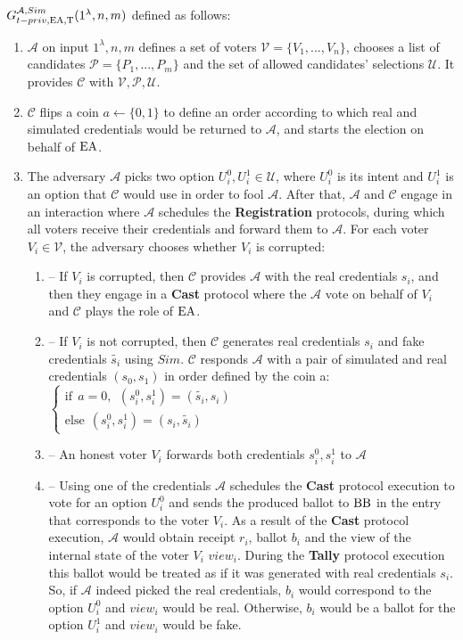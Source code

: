  $G_{t-priv,\operatorname{EA},\operatorname{T}}^{\mathcal{A}, Sim}(1^{\lambda},n,m)$ defined as follows:\\
\begin{enumerate}
\item $\mathcal{A}$ on input $1^{\lambda},n,m$ defines a set of voters  $\mathcal{V} = \{V_1,...,V_n\}$, chooses a list of candidates  $\mathcal{P} = \{P_1,...,P_m\}$ and the set of allowed candidates' selections $\mathcal{U}$.  It provides $\mathcal{C}$ with $\mathcal{V}, \mathcal{P}, \mathcal{U}$.
\item $\mathcal{C}$ flips a coin $a \leftarrow \{0,1\}$ to define an order according to which real and simulated credentials would be returned to $\mathcal{A}$, and starts the election on behalf of $\operatorname{EA}$. 
\item The adversary $\mathcal{A}$ picks two option $U^0_i,U^1_i \in \mathcal{U}$, where $U^0_i$ is its intent and $U^1_i$ is an option that $\mathcal{C}$ would use in order to fool $\mathcal{A}$.  After that, $\mathcal{A}$  and $\mathcal{C}$ engage in an interaction where $\mathcal{A}$ schedules the \textbf{Registration} protocols, during which all voters receive their credentials and forward them to  $\mathcal{A}$. For each voter $V_i \in \mathcal{V}$, the adversary chooses whether $V_i$ is corrupted:
\begin{enumerate}
\item[] -- If $V_i$ is corrupted, then $\mathcal{C}$ provides $\mathcal{A}$ with the real credentials $s_i$, and then they engage in a \textbf{Cast} protocol where the $\mathcal{A}$  vote on behalf of $V_i$ and  $\mathcal{C}$ plays the role of $\operatorname{EA}$.
\item[] --  If $V_i$ is not corrupted, then $\mathcal{C}$ generates real credentials $s_i$  and fake credentials $\tilde{s_i}$ using $Sim$.  $\mathcal{C}$  responds  $\mathcal{A}$ with a pair of simulated and real credentials $(s_0,s_1)$ in order defined by the coin a:\\
$ \begin{cases}
 \text{if} ~~a =0,~~ (s^0_i,s^1_i) = (\tilde{s_i},s_i)  \\ 
 \text{else}~~  (s^0_i,s^1_i) = (s_i,\tilde{s_i})
\end{cases}$
 \item[] -- An honest voter $V_i$ forwards both credentials $s^0_i,s^1_i$ to $\mathcal{A}$
\item[] -- Using one of the credentials $\mathcal{A}$ schedules the \textbf{Cast} protocol execution to vote for an option $U^0_i$ and sends the produced ballot to $\operatorname{BB}$ in the entry that corresponds to the voter $V_i$. As a result of the \textbf{Cast} protocol execution, $\mathcal{A}$ would obtain receipt $r_i$, ballot $b_i$ and the view of the internal state of the voter $V_i$ $view_i$.  During the \textbf{Tally} protocol execution this ballot would be treated as if it was generated with real credentials $s_i$. So, if  $\mathcal{A}$ indeed picked the real credentials, $b_i$ would correspond to the option   $U^0_i$  and $view_i$ would be real. Otherwise, $b_i$ would be a ballot for the option  $U^1_i$ and $view_i$ would be fake. 

\end{enumerate}
\end{enumerate}
